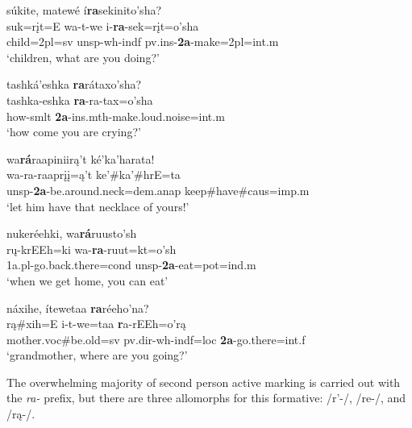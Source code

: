 \begin{exe}
\begin{xlist}
	\item \glll súkite, matewé í\textbf{ra}sekinito'sha?\\
	suk=rįt=E wa-t-we i-\textbf{ra}-sek=rįt=o'sha\\
	\textnormal{child}=2pl=sv unsp-wh-indf pv.ins-\textbf{2a}-\textnormal{make}=2pl=int.m\\
	\glt `children, what are you doing?' \citep[28]{hollow1973a}
	
	\item \glll tashká'eshka \textbf{ra}rátaxo'sha?\\
	tashka-eshka \textbf{ra}-ra-tax=o'sha\\
	\textnormal{how}-smlt \textbf{2a}-ins.mth-\textnormal{make.loud.noise}=int.m\\
	\glt `how come you are crying?' \citep[42]{hollow1973a}
	
	\item \glll wa\textbf{rá}raapiniirą't ké'ka'harata!\\
	wa-ra-raaprįį=ą't ke'\#ka'\#hrE=ta\\
	unsp-\textbf{2a}-\textnormal{be.around.neck}=dem.anap \textnormal{keep}\#\textnormal{have}\#caus=imp.m\\
	\glt `let him have that necklace of yours!' \citep[58]{hollow1973a}
	
	\item \glll nukeréehki, wa\textbf{rá}ruusto'sh\\
	rų-krEEh=ki wa-\textbf{ra}-ruut=kt=o'sh\\
	1a.pl-\textnormal{go.back.there}=cond unsp-\textbf{2a}-\textnormal{eat}=pot=ind.m\\
	\glt `when we get home, you can eat' \citep[87]{hollow1973a}
	
	\item \glll náxihe, ítewetaa \textbf{ra}réeho'na?\\
	rą\#xih=E i-t-we=taa\textbf{ r}a-rEEh=o'rą\\
	\textnormal{mother}.voc\#\textnormal{be.old}=sv pv.dir-wh-indf=loc \textbf{2a}-\textnormal{go.there}=int.f\\
	\glt `grandmother, where are you going?' \citep[89]{hollow1973a}
	
	\end{xlist}
\end{exe}

The overwhelming majority of second person active marking is carried out with the \textit{ra-} prefix, but there are three allomorphs for this formative: /r'-/, /re-/, and /rą-/. 

